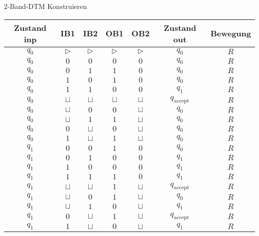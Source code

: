 \documentclass[answers]{submit}
\begin{document}
\begin{exercise}[6]{$2$-Band-DTM Konstruieren}
{  \begin{center}
    \begin{tabular}{c|c|c|c|c|c|c}
      Zustand inp & IB1      & IB2      & OB1      & OB2      & Zustand out         & Bewegung \\\hline
      $q_0$       & $\rhd$   & $\rhd$   & $\rhd$   & $\rhd$   & $q_0$               & $R$      \\\hline
      $q_0$       & $0$      & $0$      & $0$      & $0$      & $q_0$               & $R$      \\\hline
      $q_0$       & $0$      & $1$      & $1$      & $0$      & $q_0$               & $R$      \\\hline
      $q_0$       & $1$      & $0$      & $1$      & $0$      & $q_0$               & $R$      \\\hline
      $q_0$       & $1$      & $1$      & $0$      & $0$      & $q_1$               & $R$      \\\hline
      $q_0$       & $\sqcup$ & $\sqcup$ & $\sqcup$ & $\sqcup$ & $q_{\text{accept}}$ & $R$      \\\hline
      $q_0$       & $\sqcup$ & $0$      & $0$      & $\sqcup$ & $q_0$               & $R$      \\\hline
      $q_0$       & $\sqcup$ & $1$      & $1$      & $\sqcup$ & $q_0$               & $R$      \\\hline
      $q_0$       & $0$      & $\sqcup$ & $0$      & $\sqcup$ & $q_0$               & $R$      \\\hline
      $q_0$       & $1$      & $\sqcup$ & $1$      & $\sqcup$ & $q_0$               & $R$      \\\hline
      $q_1$       & $0$      & $0$      & $1$      & $0$      & $q_0$               & $R$      \\\hline
      $q_1$       & $0$      & $1$      & $0$      & $0$      & $q_1$               & $R$      \\\hline
      $q_1$       & $1$      & $0$      & $0$      & $0$      & $q_1$               & $R$      \\\hline
      $q_1$       & $1$      & $1$      & $1$      & $0$      & $q_1$               & $R$      \\\hline
      $q_1$       & $\sqcup$ & $\sqcup$ & $1$      & $\sqcup$ & $q_{\text{accept}}$ & $R$      \\\hline
      $q_1$       & $\sqcup$ & $0$      & $1$      & $\sqcup$ & $q_0$               & $R$      \\\hline
      $q_1$       & $\sqcup$ & $1$      & $0$      & $\sqcup$ & $q_1$               & $R$      \\\hline
      $q_1$       & $0$      & $\sqcup$ & $1$      & $\sqcup$ & $q_{\text{accept}}$ & $R$      \\\hline
      $q_1$       & $1$      & $\sqcup$ & $0$      & $\sqcup$ & $q_1$               & $R$      \\\hline
    \end{tabular}
  \end{center}

}
\end{exercise}
\end{document}
